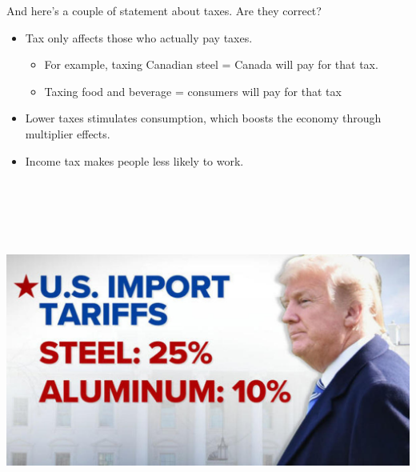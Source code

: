 \documentclass[
  ignorenonframetext,
]{beamer}
\providecommand{\tightlist}{%
  \setlength{\itemsep}{0pt}\setlength{\parskip}{0pt}}
\begin{document}
\begin{frame}{And here's a couple of statement about taxes. Are they
correct?}
\protect\hypertarget{and-heres-a-couple-of-statement-about-taxes.-are-they-correct}{}
\begin{itemize}
\tightlist
\item
  Tax only affects those who actually pay taxes.

  \begin{itemize}
  \tightlist
  \item
    For example, taxing Canadian steel = Canada will pay for that tax.
  \item
    Taxing food and beverage = consumers will pay for that tax
  \end{itemize}
\item
  Lower taxes stimulates consumption, which boosts the economy through
  multiplier effects.
\item
  Income tax makes people less likely to work.
\end{itemize}
\end{frame}

\begin{frame}{}
\protect\hypertarget{section-2}{}
\includegraphics[width=\textwidth,height=4.6875in]{figures/trump_steel_tariff.jpeg}
\end{frame}
\end{document}
